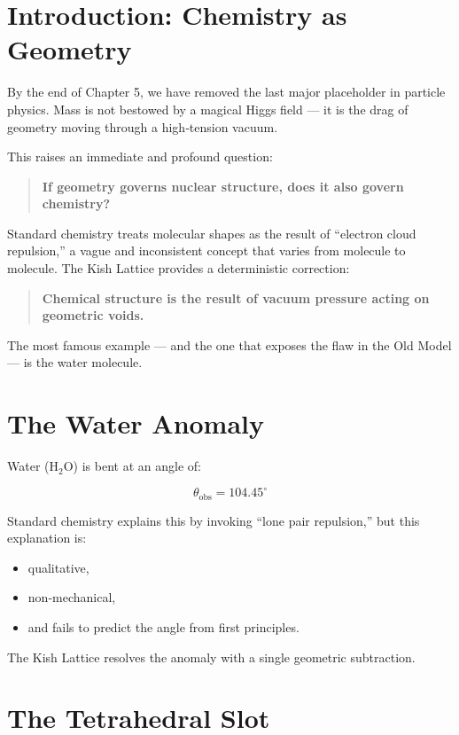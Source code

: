 \documentclass[11pt, letterpaper, openany]{book}
\begin{document}
\section{Introduction: Chemistry as Geometry}

By the end of Chapter 5, we have removed the last major placeholder in particle physics.  
Mass is not bestowed by a magical Higgs field — it is the drag of geometry moving through a high‑tension vacuum.

This raises an immediate and profound question:

\begin{quote}
\textbf{If geometry governs nuclear structure, does it also govern chemistry?}
\end{quote}

Standard chemistry treats molecular shapes as the result of “electron cloud repulsion,” a vague and inconsistent concept that varies from molecule to molecule.  
The Kish Lattice provides a deterministic correction:

\begin{quote}
\textbf{Chemical structure is the result of vacuum pressure acting on geometric voids.}
\end{quote}

The most famous example — and the one that exposes the flaw in the Old Model — is the water molecule.

\section{The Water Anomaly}

Water (H$_2$O) is bent at an angle of:



\[
\theta_{\text{obs}} = 104.45^\circ
\]



Standard chemistry explains this by invoking “lone pair repulsion,” but this explanation is:

\begin{itemize}
    \item qualitative,
    \item non‑mechanical,
    \item and fails to predict the angle from first principles.
\end{itemize}

The Kish Lattice resolves the anomaly with a single geometric subtraction.

\section{The Tetrahedral Slot}
\end{document}
